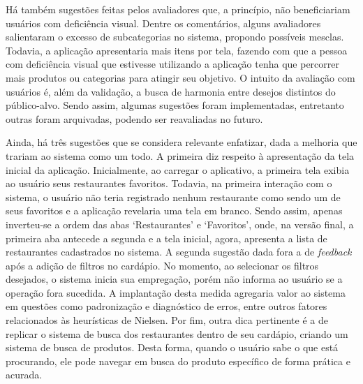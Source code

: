 Há também sugestões feitas pelos avaliadores que, a princípio, não beneficiariam usuários com deficiência visual. Dentre os comentários, alguns avaliadores salientaram o excesso de subcategorias no sistema, propondo possíveis mesclas. Todavia, a aplicação apresentaria mais itens por tela, fazendo com que a pessoa com deficiência visual que estivesse utilizando a aplicação tenha que percorrer mais produtos ou categorias para atingir seu objetivo. O intuito da avaliação com usuários é, além da validação, a busca de harmonia entre desejos distintos do público-alvo. Sendo assim, algumas sugestões foram implementadas, entretanto outras foram arquivadas, podendo ser reavaliadas no futuro.

Ainda, há três sugestões que se considera relevante enfatizar, dada a melhoria que trariam ao sistema como um todo. A primeira diz respeito à apresentação da tela inicial da aplicação. Inicialmente, ao carregar o aplicativo, a primeira tela exibia ao usuário seus restaurantes favoritos. Todavia, na primeira interação com o sistema, o usuário não teria registrado nenhum restaurante como sendo um de seus favoritos e a aplicação revelaria uma tela em branco. Sendo assim, apenas inverteu-se a ordem das abas ‘Restaurantes’ e ‘Favoritos’, onde, na versão final, a primeira aba antecede a segunda e a tela inicial, agora, apresenta a lista de restaurantes cadastrados no sistema. A segunda sugestão dada fora a de \emph{feedback} após a adição de filtros no cardápio. No momento, ao selecionar os filtros desejados, o sistema inicia sua empregação, porém não informa ao usuário se a operação fora sucedida. A implantação desta medida agregaria valor ao sistema em questões como padronização e diagnóstico de erros, entre outros fatores relacionados às heurísticas de Nielsen. Por fim, outra dica pertinente é a de replicar o sistema de busca dos restaurantes dentro de seu cardápio, criando um sistema de busca de produtos. Desta forma, quando o usuário sabe o que está procurando, ele pode navegar em busca do produto específico de forma prática e acurada.


